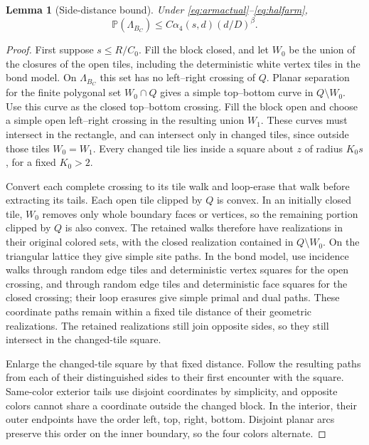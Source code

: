 \documentclass[11pt]{amsart}
\newtheorem{lemma}[theorem]{Lemma}
\theoremstyle{remark}
\newcommand{\Prob}{\mathbb P}
\begin{document}
\begin{lemma}[Side-distance bound]\label{lem:sidebound}
Under \eqref{eq:armactual}--\eqref{eq:halfarm},
\begin{equation}\label{eq:sidebound}
 \Prob(\Lambda_{B_C})\le C\alpha_4(s,d)(d/D)^\beta.
\end{equation}
\end{lemma}
\begin{proof}
First suppose $s\le R/C_0$. Fill the block closed, and let $W_0$ be the union of the closures of the open tiles, including the deterministic white vertex tiles in the bond model. On $\Lambda_{B_C}$ this set has no left--right crossing of $Q$. Planar separation for the finite polygonal set $W_0\cap Q$ gives a simple top--bottom curve in $Q\setminus W_0$. Use this curve as the closed top--bottom crossing. Fill the block open and choose a simple open left--right crossing in the resulting union $W_1$. These curves must intersect in the rectangle, and can intersect only in changed tiles, since outside those tiles $W_0=W_1$. Every changed tile lies inside a square about $z$ of radius $K_0s$, for a fixed $K_0>2$.

Convert each complete crossing to its tile walk and loop-erase that walk before extracting its tails. Each open tile clipped by $Q$ is convex. In an initially closed tile, $W_0$ removes only whole boundary faces or vertices, so the remaining portion clipped by $Q$ is also convex. The retained walks therefore have realizations in their original colored sets, with the closed realization contained in $Q\setminus W_0$. On the triangular lattice they give simple site paths. In the bond model, use incidence walks through random edge tiles and deterministic vertex squares for the open crossing, and through random edge tiles and deterministic face squares for the closed crossing; their loop erasures give simple primal and dual paths. These coordinate paths remain within a fixed tile distance of their geometric realizations. The retained realizations still join opposite sides, so they still intersect in the changed-tile square.

Enlarge the changed-tile square by that fixed distance. Follow the resulting paths from each of their distinguished sides to their first encounter with the square. Same-color exterior tails use disjoint coordinates by simplicity, and opposite colors cannot share a coordinate outside the changed block. In the interior, their outer endpoints have the order left, top, right, bottom. Disjoint planar arcs preserve this order on the inner boundary, so the four colors alternate.


\end{proof}
\end{document}
